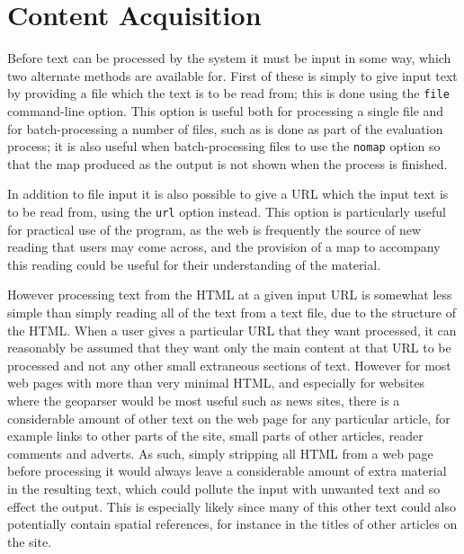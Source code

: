 \documentclass[12pt, a4paper]{report}
\begin{document}
\section{Content Acquisition}
\label{content_acquisition}

Before text can be processed by the system it must be input in some way, which two alternate methods are available for. First of these is simply to give input text by providing a file which the text is to be read from; this is done using the \verb#file# command-line option. This option is useful both for processing a single file and for batch-processing a number of files, such as is done as part of the evaluation process; it is also useful when batch-processing files to use the \verb#nomap# option so that the map produced as the output is not shown when the process is finished.

In addition to file input it is also possible to give a URL which the input text is to be read from, using the \verb#url# option instead. This option is particularly useful for practical use of the program, as the web is frequently the source of new reading that users may come across, and the provision of a map to accompany this reading could be useful for their understanding of the material.

However processing text from the HTML at a given input URL is somewhat less simple than simply reading all of the text from a text file, due to the structure of the HTML. When a user gives a particular URL that they want processed, it can reasonably be assumed that they want only the main content at that URL to be processed and not any other small extraneous sections of text. However for most web pages with more than very minimal HTML, and especially for websites where the geoparser would be most useful such as news sites, there is a considerable amount of other text on the web page for any particular article, for example links to other parts of the site, small parts of other articles, reader comments and adverts. As such, simply stripping all HTML from a web page before processing it would always leave a considerable amount of extra material in the resulting text, which could pollute the input with unwanted text and so effect the output. This is especially likely since many of this other text could also potentially contain spatial references, for instance in the titles of other articles on the site.
\end{document}
